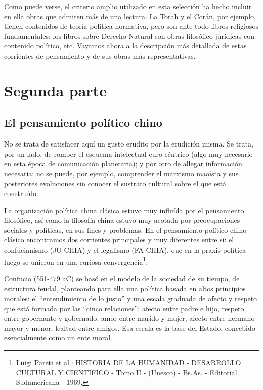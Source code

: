 \documentclass[
]{book}
\begin{document}
Como puede verse, el criterio amplio utilizado en esta selección ha hecho incluir en ella obras que admiten más de una lectura. La Torah y el Corán, por ejemplo, tienen contenidos de teoría política normativa, pero son ante todo libros religiosos fundamentales; los libros sobre Derecho Natural son obras filosófico-jurídicas con contenido político, etc. Vayamos ahora a la descripción más detallada de estas corrientes de pensamiento y de sus obras más representativas.

\hypertarget{segunda-parte-1}{%
\section*{Segunda parte}\label{segunda-parte-1}}

\hypertarget{el-pensamiento-poluxedtico-chino}{%
\subsection*{El pensamiento político chino}\label{el-pensamiento-poluxedtico-chino}}

No se trata de satisfacer aquí un gusto erudito por la erudición misma. Se trata, por un lado, de romper el esquema intelectual euro-céntrico (algo muy necesario en esta época de comunicación planetaria); y por otro de allegar información necesaria: no se puede, por ejemplo, comprender el marxismo maoísta y sus posteriores evoluciones sin conocer el sustrato cultural sobre el que está construído.

La organización política china clásica estuvo muy influída por el pensamiento filosófico, así como la filosofía china estuvo muy acotada por preocupaciones sociales y políticas, en sus fines y problemas. En el pensamiento político chino clásico encontramos dos corrientes principales y muy diferentes entre sí: el confucianismo (JU-CHIA) y el legalismo (FA-CHIA), que en la praxis política luego se unieron en una curiosa convergencia\footnote{Luigi Pareti et al.: HISTORIA DE LA HUMANIDAD - DESARROLLO CULTURAL Y CIENTIFICO - Tomo II - (Unesco) - Bs.As. - Editorial Sudamericana - 1969.}.

Confucio (551-479 aC) se basó en el modelo de la sociedad de su tiempo, de estructura feudal, planteando para ella una política basada en altos principios morales: el ``entendimiento de lo justo'' y una escala graduada de afecto y respeto que está formada por las ``cinco relaciones'': afecto entre padre e hijo, respeto entre gobernante y gobernado, amor entre marido y mujer, afecto entre hermano mayor y menor, lealtad entre amigos. Esa escala es la base del Estado, concebido esencialmente como un ente moral.
\end{document}

